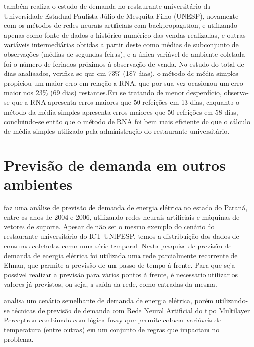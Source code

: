 \documentclass[	12pt, Times, openright, twoside, a4paper, english, brazil]{abntex2}
\begin{document}
         \cite{Rocha2011} também realiza o estudo de demanda no restaurante universitário da Universidade Estadual Paulista Júlio de Mesquita Filho (UNESP), novamente com os métodos de redes neurais artificiais com backpropagation, e utilizando apenas como fonte de dados o histórico numérico das vendas realizadas, e outras variáveis intermediárias obtidas a partir deste como médias de subconjunto de observações (médias de segundas-feiras), e a única variável de ambiente coletada foi o número de feriados próximos à observação de venda. No estudo do total de dias analisados, verifica-se que em 73\% (187 dias), o método de média simples propiciou um maior erro em relação à RNA, que por sua vez ocasionou um erro maior nos 23\% (69 dias) restantes.Em se tratando de menor desperdício, observa-se que a RNA apresenta erros maiores que 50 refeições em 13 dias, enquanto o método da média simples apresenta erros maiores que 50 refeições em 58 dias, concluindo-se então que o método de RNA foi bem mais eficiente do que o cálculo de média simples utilizado pela administração do restaurante universitário.
      
      \section{Previsão de demanda em outros ambientes} 
         \cite{RUAS2012} faz uma análise de previsão de demanda de energia elétrica no estado do Paraná, entre os anos de 2004 e 2006, utilizando redes neurais artificiais e máquinas de vetores de suporte. Apesar de não ser o mesmo exemplo do cenário do restaurante universitário do ICT UNIFESP, temos a distribuição dos dados de consumo coletados como uma série temporal. Nesta pesquisa de previsão de demanda de energia elétrica foi utilizada uma rede parcialmente recorrente de Elman, que permite a previsão de um passo de tempo à frente. Para que seja possível realizar a previsão para vários pontos à frente, é necessário utilizar os valores já previstos, ou seja, a saída da rede, como entradas da mesma.
        
         \cite{Almeida2013} analisa um cenário semelhante de demanda de energia elétrica, porém utilizando-se técnicas de previsão de demanda com Rede Neural Artificial do tipo Multilayer Perceptron combinado com lógica fuzzy que permite colocar variáveis de temperatura (entre outras) em um conjunto de regras que impactam no problema.
        
\end{document}
